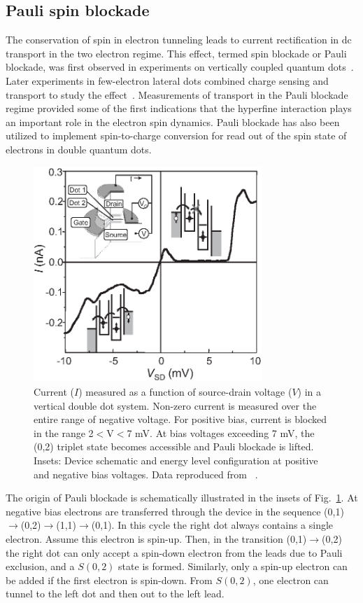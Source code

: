 \documentclass[12pt,aps,nofootinbib]{revtex4-1}
\begin{document}
\subsection{Pauli spin blockade}
\label{Sec:PauliBlockade}
The conservation of spin in electron tunneling leads to current
rectification in dc transport in the two electron regime. This
effect, termed spin blockade or Pauli blockade, was first observed
in experiments on vertically coupled quantum
dots~\cite{OnoSpinBlock}. Later experiments in few-electron
lateral dots combined charge sensing and transport to study the
effect~\cite{JohnsonSpinBlock}. Measurements of transport in the
Pauli blockade regime provided some of the first indications that
the hyperfine interaction plays an important role in the electron
spin dynamics. Pauli blockade has also been utilized to implement
spin-to-charge conversion for read out of the spin state of
electrons in double quantum dots.

\begin{figure}[hbt]
\includegraphics[width=3.4in]{hanson_fig33.eps}
\caption{Current ($I$) measured as a function of
source-drain voltage ($V$) in a vertical double dot system.
Non-zero current is measured over the entire range of negative
voltage. For positive bias, current is blocked in the range
2$<$V$<$7 mV. At bias voltages exceeding 7 mV, the (0,2) triplet
state becomes accessible and Pauli blockade is lifted. Insets:
Device schematic and energy level configuration at positive and
negative bias voltages. Data reproduced from ~\textcite{OnoSpinBlock}.}
\label{Fig:Ono1}
\end{figure}

The origin of Pauli blockade is schematically illustrated in the
insets of Fig.~\ref{Fig:Ono1}. At negative bias electrons are
transferred through the device in the sequence
(0,1)$\rightarrow$(0,2)$\rightarrow$(1,1)$\rightarrow$(0,1). In
this cycle the right dot always contains a single electron. Assume
this electron is spin-up. Then, in the transition
(0,1)$\rightarrow$(0,2) the right dot can only accept a spin-down
electron from the leads due to Pauli exclusion, and a $S(0,2)$
state is formed. Similarly, only a spin-up electron can be added
if the first electron is spin-down. From $S(0,2)$, one electron
can tunnel to the left dot and then out to the left lead.
\end{document}
